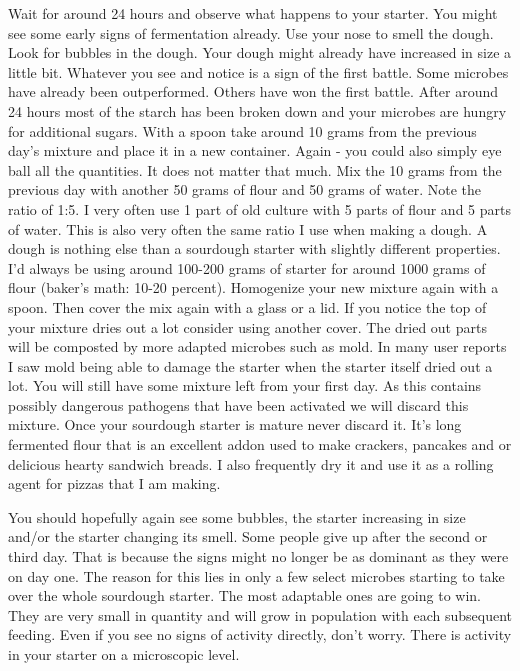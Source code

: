 Wait for around 24 hours and observe what happens to your starter.
You might see some early signs of fermentation already. Use your nose
to smell the dough. Look for bubbles in the dough. Your dough
might already have increased in size a little bit. Whatever
you see and notice is a sign of the first battle. Some microbes
have already been outperformed. Others have won the first battle.
After around 24 hours most of the starch has been broken down
and your microbes are hungry for additional sugars. With a spoon
take around 10 grams from the previous day's mixture and place
it in a new container. Again - you could also simply eye ball
all the quantities. It does not matter that much. Mix the 10
grams from the previous day with another 50 grams of flour
and 50 grams of water. Note the ratio of 1:5. I very often use
1 part of old culture with 5 parts of flour and 5 parts of water.
This is also very often the same ratio I use when making a dough.
A dough is nothing else than a sourdough starter with slightly different
properties. I'd always be using around 100-200 grams of starter
for around 1000 grams of flour (baker's math: 10-20 percent).
Homogenize your new mixture again with a spoon. Then cover
the mix again with a glass or a lid. If you notice the top of
your mixture dries out a lot consider using another cover. The
dried out parts will be composted by more adapted microbes such as
mold. In many user reports I saw mold being able to damage
the starter when the starter itself dried out a lot. You will
still have some mixture left from your first day. As this contains
possibly dangerous pathogens that have been activated we will discard
this mixture. Once your sourdough starter is mature never
discard it. It's long fermented flour that is an excellent addon
used to make crackers, pancakes and or delicious hearty sandwich
breads. I also frequently dry it and use it as a rolling agent
for pizzas that I am making.

You should hopefully again see some bubbles, the starter increasing
in size and/or the starter changing its smell. Some people give
up after the second or third day. That is because the signs might no longer
be as dominant as they were on day one. The reason for this lies in only a few
select microbes starting to take over the whole sourdough starter. The most
adaptable ones are going to win. They are very small in quantity and will
grow in population with each subsequent feeding. Even if you see no signs
of activity directly, don't worry. There is activity in
your starter on a microscopic level.

